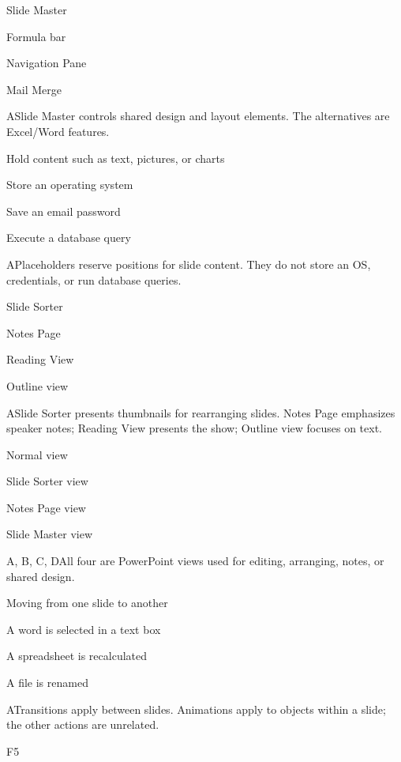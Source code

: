 \begin{enumerate}[label=\textbf{Q\arabic*.}, leftmargin=*]
  {\item Slide Master
   \item Formula bar
   \item Navigation Pane
   \item Mail Merge}
  {A}{Slide Master controls shared design and layout elements. The alternatives are Excel/Word features.}
  {\item Hold content such as text, pictures, or charts
   \item Store an operating system
   \item Save an email password
   \item Execute a database query}
  {A}{Placeholders reserve positions for slide content. They do not store an OS, credentials, or run database queries.}
  {\item Slide Sorter
   \item Notes Page
   \item Reading View
   \item Outline view}
  {A}{Slide Sorter presents thumbnails for rearranging slides. Notes Page emphasizes speaker notes; Reading View presents the show; Outline view focuses on text.}
  {\item Normal view
   \item Slide Sorter view
   \item Notes Page view
   \item Slide Master view}
  {A, B, C, D}{All four are PowerPoint views used for editing, arranging, notes, or shared design.}
\fi
\ifnum{}
  {\item Moving from one slide to another
   \item A word is selected in a text box
   \item A spreadsheet is recalculated
   \item A file is renamed}
  {A}{Transitions apply between slides. Animations apply to objects within a slide; the other actions are unrelated.}
  {\item F5
}
\end{enumerate}

